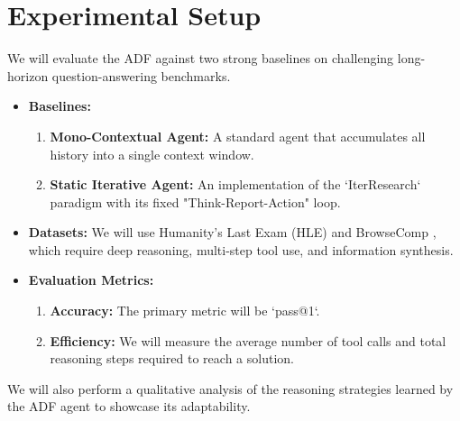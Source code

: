 \documentclass{article}
\begin{document}
\section{Experimental Setup}
We will evaluate the ADF against two strong baselines on challenging long-horizon question-answering benchmarks.
\begin{itemize}
    \item \textbf{Baselines:}
    \begin{enumerate}
        \item \textbf{Mono-Contextual Agent:} A standard agent that accumulates all history into a single context window.
        \item \textbf{Static Iterative Agent:} An implementation of the `IterResearch` paradigm with its fixed "Think-Report-Action" loop.
    \end{enumerate}
    \item \textbf{Datasets:} We will use Humanity's Last Exam (HLE) \cite{phan2025humanity} and BrowseComp \cite{wei2025browsecomp}, which require deep reasoning, multi-step tool use, and information synthesis.
    \item \textbf{Evaluation Metrics:}
    \begin{enumerate}
        \item \textbf{Accuracy:} The primary metric will be `pass@1`.
        \item \textbf{Efficiency:} We will measure the average number of tool calls and total reasoning steps required to reach a solution.
    \end{enumerate}
\end{itemize}
We will also perform a qualitative analysis of the reasoning strategies learned by the ADF agent to showcase its adaptability.
\end{document}
